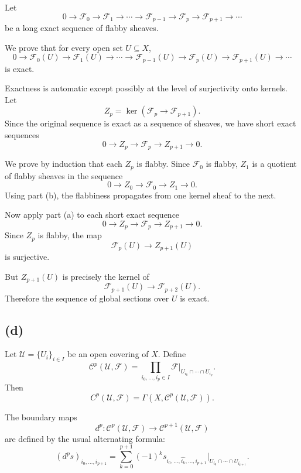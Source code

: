 \documentclass[12pt,a4paper]{article}
\theoremstyle{notespace}
\begin{document}
Let
\[
0\longrightarrow \mathcal F_0
\longrightarrow \mathcal F_1
\longrightarrow \cdots
\longrightarrow \mathcal F_{p-1}
\longrightarrow \mathcal F_p
\longrightarrow \mathcal F_{p+1}
\longrightarrow \cdots
\]
be a long exact sequence of flabby sheaves.

We prove that for every open set $U\subseteq X$,
\[
0\longrightarrow \mathcal F_0(U)
\longrightarrow \mathcal F_1(U)
\longrightarrow \cdots
\longrightarrow \mathcal F_{p-1}(U)
\longrightarrow \mathcal F_p(U)
\longrightarrow \mathcal F_{p+1}(U)
\longrightarrow \cdots
\]
is exact.

Exactness is automatic except possibly at the level of surjectivity onto
kernels. Let
\[
Z_p=\ker(\mathcal F_p\to \mathcal F_{p+1}).
\]
Since the original sequence is exact as a sequence of sheaves, we have short
exact sequences
\[
0\longrightarrow Z_p
\longrightarrow \mathcal F_p
\longrightarrow Z_{p+1}
\longrightarrow 0.
\]

We prove by induction that each $Z_p$ is flabby. Since $\mathcal F_0$ is
flabby, $Z_1$ is a quotient of flabby sheaves in the sequence
\[
0\longrightarrow Z_0
\longrightarrow \mathcal F_0
\longrightarrow Z_1
\longrightarrow 0.
\]
Using part (b), the flabbiness propagates from one kernel sheaf to the next.

Now apply part (a) to each short exact sequence
\[
0\longrightarrow Z_p
\longrightarrow \mathcal F_p
\longrightarrow Z_{p+1}
\longrightarrow 0.
\]
Since $Z_p$ is flabby, the map
\[
\mathcal F_p(U)\longrightarrow Z_{p+1}(U)
\]
is surjective.

But $Z_{p+1}(U)$ is precisely the kernel of
\[
\mathcal F_{p+1}(U)\longrightarrow \mathcal F_{p+2}(U).
\]
Therefore the sequence of global sections over $U$ is exact.

\subsection*{(d)}

Let $\mathcal U=\{U_i\}_{i\in I}$ be an open covering of $X$. Define
\[
\mathcal C^p(\mathcal U,\mathcal F)
=
\prod_{i_0,\ldots,i_p\in I}
\mathcal F|_{U_{i_0}\cap\cdots\cap U_{i_p}}.
\]
Then
\[
C^p(\mathcal U,\mathcal F)
=
\Gamma(X,\mathcal C^p(\mathcal U,\mathcal F)).
\]

The boundary maps
\[
d^p:\mathcal C^p(\mathcal U,\mathcal F)
\longrightarrow
\mathcal C^{p+1}(\mathcal U,\mathcal F)
\]
are defined by the usual alternating formula:
\[
(d^p s)_{i_0,\ldots,i_{p+1}}
=
\sum_{k=0}^{p+1}
(-1)^k
s_{i_0,\ldots,\widehat{i_k},\ldots,i_{p+1}}
\big|_{U_{i_0}\cap\cdots\cap U_{i_{p+1}}}.
\]
\end{document}
